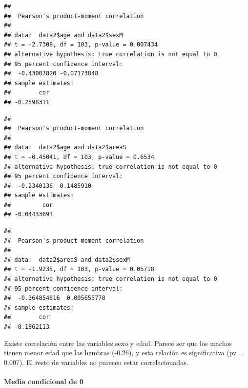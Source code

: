 \documentclass[
]{article}
\newenvironment{Shaded}{\begin{snugshade}}{\end{snugshade}}
\newcommand{\CommentTok}[1]{\textcolor[rgb]{0.56,0.35,0.01}{\textit{#1}}}
\newcommand{\FunctionTok}[1]{\textcolor[rgb]{0.00,0.00,0.00}{#1}}
\newcommand{\NormalTok}[1]{#1}
\newcommand{\SpecialCharTok}[1]{\textcolor[rgb]{0.00,0.00,0.00}{#1}}
\begin{document}
\begin{verbatim}
## 
##  Pearson's product-moment correlation
## 
## data:  data2$age and data2$sexM
## t = -2.7308, df = 103, p-value = 0.007434
## alternative hypothesis: true correlation is not equal to 0
## 95 percent confidence interval:
##  -0.43007820 -0.07173848
## sample estimates:
##        cor 
## -0.2598311
\end{verbatim}

\begin{Shaded}
\end{Shaded}

\begin{verbatim}
## 
##  Pearson's product-moment correlation
## 
## data:  data2$age and data2$areaS
## t = -0.45041, df = 103, p-value = 0.6534
## alternative hypothesis: true correlation is not equal to 0
## 95 percent confidence interval:
##  -0.2340136  0.1485910
## sample estimates:
##         cor 
## -0.04433691
\end{verbatim}

\begin{Shaded}
\end{Shaded}

\begin{verbatim}
## 
##  Pearson's product-moment correlation
## 
## data:  data2$areaS and data2$sexM
## t = -1.9235, df = 103, p-value = 0.05718
## alternative hypothesis: true correlation is not equal to 0
## 95 percent confidence interval:
##  -0.364854816  0.005655778
## sample estimates:
##        cor 
## -0.1862113
\end{verbatim}

Existe correlación entre las variables sexo y edad. Parece ser que los
machos tienen menor edad que las hembras (-0.26), y esta relación es
significativa (pv = 0.007). El resto de variables no parecen estar
correlacionadas.

\hypertarget{media-condicional-de-0}{%
\paragraph{Media condicional de 0}\label{media-condicional-de-0}}
\end{document}
